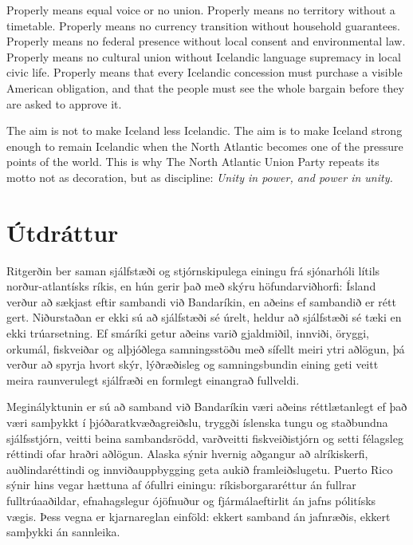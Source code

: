 \documentclass[11pt,a4paper]{article}
\newcommand{\PartyEN}{The North Atlantic Union Party}
\newcommand{\MottoEN}{Unity in power, and power in unity}
\begin{document}
Properly means equal voice or no union. Properly means no territory without a timetable. Properly means no currency transition without household guarantees. Properly means no federal presence without local consent and environmental law. Properly means no cultural union without Icelandic language supremacy in local civic life. Properly means that every Icelandic concession must purchase a visible American obligation, and that the people must see the whole bargain before they are asked to approve it.

The aim is not to make Iceland less Icelandic. The aim is to make Iceland strong enough to remain Icelandic when the North Atlantic becomes one of the pressure points of the world. This is why \PartyEN{} repeats its motto not as decoration, but as discipline: \textit{\MottoEN.}

\section*{Útdráttur}

Ritgerðin ber saman sjálfstæði og stjórnskipulega einingu frá sjónarhóli lítils norður-atlantísks ríkis, en hún gerir það með skýru höfundarviðhorfi: Ísland verður að sækjast eftir sambandi við Bandaríkin, en aðeins ef sambandið er rétt gert. Niðurstaðan er ekki sú að sjálfstæði sé úrelt, heldur að sjálfstæði sé tæki en ekki trúarsetning. Ef smáríki getur aðeins varið gjaldmiðil, innviði, öryggi, orkumál, fiskveiðar og alþjóðlega samningsstöðu með sífellt meiri ytri aðlögun, þá verður að spyrja hvort skýr, lýðræðisleg og samningsbundin eining geti veitt meira raunverulegt sjálfræði en formlegt einangrað fullveldi.

Meginályktunin er sú að samband við Bandaríkin væri aðeins réttlætanlegt ef það væri samþykkt í þjóðaratkvæðagreiðslu, tryggði íslenska tungu og staðbundna sjálfsstjórn, veitti beina sambandsrödd, varðveitti fiskveiðistjórn og setti félagsleg réttindi ofar hraðri aðlögun. Alaska sýnir hvernig aðgangur að alríkiskerfi, auðlindaréttindi og innviðauppbygging geta aukið framleiðslugetu. Puerto Rico sýnir hins vegar hættuna af ófullri einingu: ríkisborgararéttur án fullrar fulltrúaaðildar, efnahagslegur ójöfnuður og fjármálaeftirlit án jafns pólitísks vægis. Þess vegna er kjarnareglan einföld: ekkert samband án jafnræðis, ekkert samþykki án sannleika.

\end{document}
